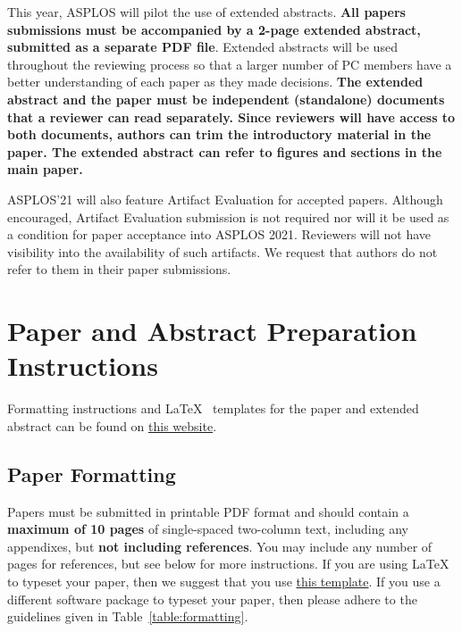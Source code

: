 \documentclass[pageno]{jpaper}
\begin{document}
This year, ASPLOS will pilot the use of extended abstracts. {\bf All
  papers submissions must be accompanied by a 2-page extended
  abstract, submitted as a separate PDF file}.  Extended abstracts
will be used throughout the reviewing process so that a larger number
of PC members have a better understanding of each paper as they made
decisions. {\bf The extended abstract and the paper must be independent (standalone) documents that a reviewer can read separately. Since reviewers will have access to both documents, authors can trim the introductory material in the paper. The extended abstract can refer to figures and sections in the main paper.}

ASPLOS'21 will also feature Artifact Evaluation for accepted papers. 
Although encouraged, Artifact Evaluation submission is not required nor will 
it be used as a condition for paper acceptance into ASPLOS 2021. Reviewers will 
not have visibility into the availability of such artifacts. We request that 
authors do not refer to them in their paper submissions.

\section{Paper and Abstract Preparation Instructions}

Formatting instructions and \LaTeX~ templates for the paper and
extended abstract can be found on
\href{https://asplos-conference.org/submissions/}{this website}.

\subsection{Paper Formatting}

Papers must be submitted in printable PDF format and should contain a
{\bf maximum of 10 pages} of single-spaced two-column text, including any
appendixes, but {\bf not
  including references}.  You may include any number of pages for
references, but see below for more instructions.  If you are using
\LaTeX~\cite{lamport94} to typeset your paper, then we suggest that
you use \href{https://asplos-conference.org/wp-content/uploads/2020/06/asplos21-templates.zip}{this template}.
If you use a different
software package to typeset your paper, then please adhere to the
guidelines given in Table~\ref{table:formatting}.
\end{document}
